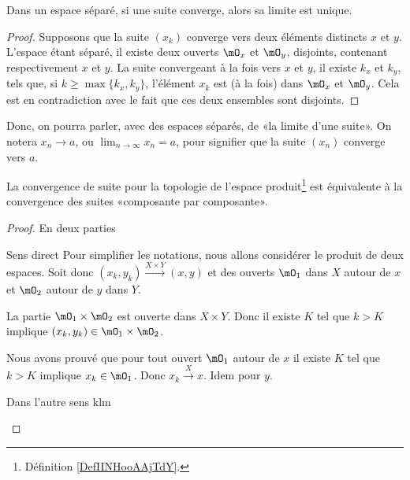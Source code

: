 \begin{proposition}\label{PropUniciteLimitePourSuites}
  Dans un espace séparé, si une suite converge, alors sa limite est unique.
\end{proposition}
\begin{proof}
  Supposons que la suite \( (x_k)\) converge vers deux éléments distincts \( x \) et \( y \). L'espace étant séparé, il existe deux ouverts \( \mO_x \) et \( \mO_y \), disjoints, contenant respectivement \( x \) et \( y \). La suite convergeant à la fois vers \( x \) et \( y \), il existe \( k_x \) et \( k_y \), tels que, si \( k \geq \max\{k_x, k_y\} \), l'élément  \( x_k \) est (à la fois) dans  \( \mO_x \) et \( \mO_y \). Cela est en contradiction avec le fait que ces deux ensembles sont disjoints.
\end{proof}

\begin{normaltext}
  Donc, on pourra parler, avec des espaces séparés, de «la limite d'une suite». On notera \( x_n\to a\), ou \(\lim_{n\to \infty} x_n = a \), pour signifier que la suite \( (x_n) \) converge vers \( a \). 
\end{normaltext}

\begin{proposition}      \label{PROPooNRRIooCPesgO}
    La convergence de suite pour la topologie de l'espace produit\footnote{Définition \ref{DefIINHooAAjTdY}.} est équivalente à la convergence des suites «composante par composante».
\end{proposition}

\begin{proof}
    En deux parties
    \begin{subproof}
        \item[Sens direct]
            Pour simplifier les notations, nous allons considérer le produit de deux espaces. Soit donc \( (x_k,y_k)\stackrel{X\times Y}{\longrightarrow}(x,y)\) et des ouverts \( \mO_1\) dans \( X\) autour de \( x\) et \( \mO_2\) autour de \( y\) dans \( Y\). 

            La partie \( \mO_1\times \mO_2\) est ouverte dans \( X\times Y\). Donc il existe \( K\) tel que \( k>K\) implique \( (x_k,y_k)\in \mO_1\times \mO_2\).

            Nous avons prouvé que pour tout ouvert \( \mO_1\) autour de \( x\) il existe \( K\) tel que \( k>K\) implique \( x_k\in \mO_1\). Donc \( x_k\stackrel{X}{\longrightarrow}x\). Idem pour \( y\).

        \item[Dans l'autre sens]
            klm
    \end{subproof}
\end{proof}

